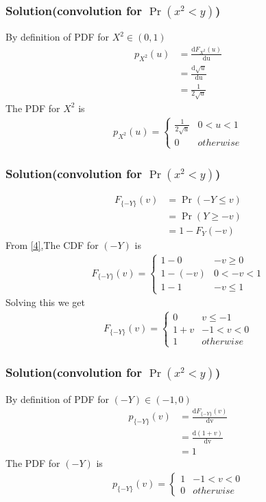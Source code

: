 \documentclass{beamer}
\begin{document}
\begin{frame}
\frametitle{Solution(convolution for $\Pr(x^2<y)$)}
By definition of PDF for $X^2 \in (0,1)$
\begin{align}
p_{X^2}(u)&=\frac{\mathrm{d}F_{X^2}(u)}{\mathrm{du}}  \\
          &=\frac{\mathrm{d}\sqrt{u}}{\mathrm{du}} \\
          &=\frac{1}{2\sqrt{u}}
\end{align}
The PDF for $X^2$ is
\begin{align}
p_{X^2}(u)  = 
\begin{cases}
      \frac{1}{2\sqrt{u}} & 0 < u < 1 \\
      0 & otherwise
\end{cases} \label{10}
\end{align}
\end{frame}
\begin{frame}
\frametitle{Solution(convolution  for $\Pr(x^2<y)$)}
\begin{align}
F_{\{-Y\}}(v)&=\Pr(-Y \leq v) \\
          &=\Pr(Y \geq -v) \\
          &=1-F_Y(-v) \label{11}
\end{align}
From \eqref{4},The CDF for $(-Y)$ is
\begin{align}
F_{\{-Y\}}(v)  = 
\begin{cases}
      1-0 & -v \geq 0\\
      1-(-v) & 0 < -v < 1 \\
      1-1 &  -v \leq 1
\end{cases}
\end{align}
Solving this we get
\begin{align}
F_{\{-Y\}}(v)  = 
\begin{cases}
      0 & v \leq -1\\
      1+v & -1 < v < 0 \\
      1 & otherwise 
\end{cases}\label{12}
\end{align}
\end{frame}
\begin{frame}
\frametitle{Solution(convolution  for $\Pr(x^2<y)$)}
By definition of PDF for $(-Y) \in (-1,0)$
\begin{align}
p_{\{-Y\}}(v)&=\frac{\mathrm{d}F_{\{-Y\}}(v)}{\mathrm{dv}}  \\
          &=\frac{\mathrm{d}(1+v)}{\mathrm{dv}} \\
          &=1
\end{align}
The PDF for $(-Y)$ is
\begin{align}
p_{\{-Y\}}(v)  = 
\begin{cases}
      1 & -1 < v < 0 \\
      0 & otherwise
\end{cases} \label{p-y}
\end{align}
\end{frame}
\end{document}
